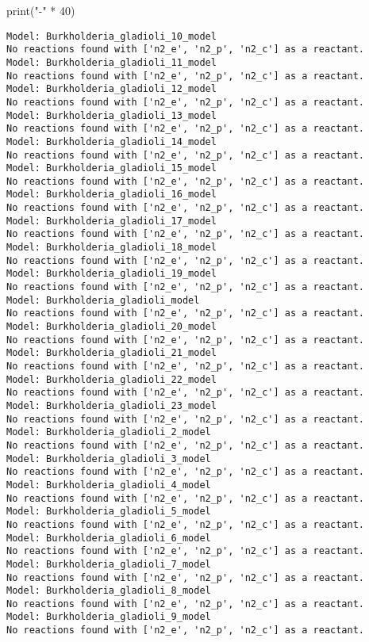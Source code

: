 \documentclass[
  letterpaper,
  DIV=11,
  numbers=noendperiod]{scrartcl}
\newenvironment{Shaded}{\begin{snugshade}}{\end{snugshade}}
\newcommand{\BuiltInTok}[1]{\textcolor[rgb]{0.00,0.23,0.31}{#1}}
\newcommand{\DecValTok}[1]{\textcolor[rgb]{0.68,0.00,0.00}{#1}}
\newcommand{\NormalTok}[1]{\textcolor[rgb]{0.00,0.23,0.31}{#1}}
\newcommand{\OperatorTok}[1]{\textcolor[rgb]{0.37,0.37,0.37}{#1}}
\newcommand{\StringTok}[1]{\textcolor[rgb]{0.13,0.47,0.30}{#1}}
\begin{document}
\begin{Shaded}
\begin{Highlighting}[]
\BuiltInTok{print}\NormalTok{(}\StringTok{"{-}"} \OperatorTok{*} \DecValTok{40}\NormalTok{)}
\end{Highlighting}
\end{Shaded}

\begin{verbatim}
Model: Burkholderia_gladioli_10_model
No reactions found with ['n2_e', 'n2_p', 'n2_c'] as a reactant.
Model: Burkholderia_gladioli_11_model
No reactions found with ['n2_e', 'n2_p', 'n2_c'] as a reactant.
Model: Burkholderia_gladioli_12_model
No reactions found with ['n2_e', 'n2_p', 'n2_c'] as a reactant.
Model: Burkholderia_gladioli_13_model
No reactions found with ['n2_e', 'n2_p', 'n2_c'] as a reactant.
Model: Burkholderia_gladioli_14_model
No reactions found with ['n2_e', 'n2_p', 'n2_c'] as a reactant.
Model: Burkholderia_gladioli_15_model
No reactions found with ['n2_e', 'n2_p', 'n2_c'] as a reactant.
Model: Burkholderia_gladioli_16_model
No reactions found with ['n2_e', 'n2_p', 'n2_c'] as a reactant.
Model: Burkholderia_gladioli_17_model
No reactions found with ['n2_e', 'n2_p', 'n2_c'] as a reactant.
Model: Burkholderia_gladioli_18_model
No reactions found with ['n2_e', 'n2_p', 'n2_c'] as a reactant.
Model: Burkholderia_gladioli_19_model
No reactions found with ['n2_e', 'n2_p', 'n2_c'] as a reactant.
Model: Burkholderia_gladioli_model
No reactions found with ['n2_e', 'n2_p', 'n2_c'] as a reactant.
Model: Burkholderia_gladioli_20_model
No reactions found with ['n2_e', 'n2_p', 'n2_c'] as a reactant.
Model: Burkholderia_gladioli_21_model
No reactions found with ['n2_e', 'n2_p', 'n2_c'] as a reactant.
Model: Burkholderia_gladioli_22_model
No reactions found with ['n2_e', 'n2_p', 'n2_c'] as a reactant.
Model: Burkholderia_gladioli_23_model
No reactions found with ['n2_e', 'n2_p', 'n2_c'] as a reactant.
Model: Burkholderia_gladioli_2_model
No reactions found with ['n2_e', 'n2_p', 'n2_c'] as a reactant.
Model: Burkholderia_gladioli_3_model
No reactions found with ['n2_e', 'n2_p', 'n2_c'] as a reactant.
Model: Burkholderia_gladioli_4_model
No reactions found with ['n2_e', 'n2_p', 'n2_c'] as a reactant.
Model: Burkholderia_gladioli_5_model
No reactions found with ['n2_e', 'n2_p', 'n2_c'] as a reactant.
Model: Burkholderia_gladioli_6_model
No reactions found with ['n2_e', 'n2_p', 'n2_c'] as a reactant.
Model: Burkholderia_gladioli_7_model
No reactions found with ['n2_e', 'n2_p', 'n2_c'] as a reactant.
Model: Burkholderia_gladioli_8_model
No reactions found with ['n2_e', 'n2_p', 'n2_c'] as a reactant.
Model: Burkholderia_gladioli_9_model
No reactions found with ['n2_e', 'n2_p', 'n2_c'] as a reactant.

\end{verbatim}
\end{document}
